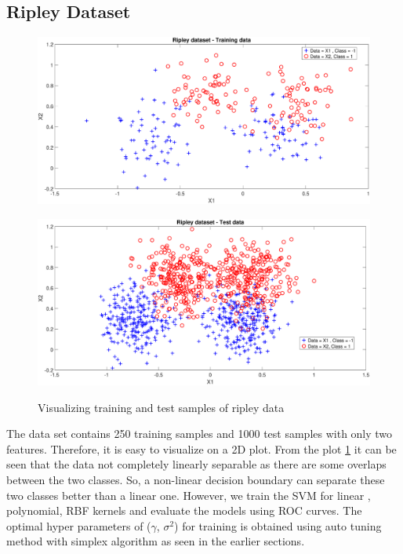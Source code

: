 {\subsection{Ripley Dataset}
\begin{figure}
	\begin{minipage}{\linewidth}
		\centering\captionsetup[subfigure]{justification=centering}
		\includegraphics[height = 0.5\linewidth, width=0.8\linewidth]{Exercise1/Report/ripley/ripley_train.eps}
		\label{fig:ripley_train}\par\vfill
		\includegraphics[height=0.5\linewidth,width=0.8\linewidth]{Exercise1/Report/ripley/ripley_test.eps}
		\label{fig:ripley_test}
	\end{minipage}
	\caption{Visualizing training and test samples of ripley data}
	\label{fig:ripley}
\end{figure}
The data set contains 250 training samples and 1000 test samples with only two features. Therefore, it is easy to visualize on a 2D plot. From the plot \ref{fig:ripley} it can be seen that the data not completely linearly separable as there are some overlaps between the two classes. So, a non-linear decision boundary can separate these two classes better than a linear one.  However, we train the SVM for linear , polynomial, RBF kernels and evaluate the models using ROC curves. The optimal hyper parameters of ($\gamma$, $\sigma^2$) for training is obtained using auto tuning method with simplex algorithm as seen in the earlier sections.\\
}
